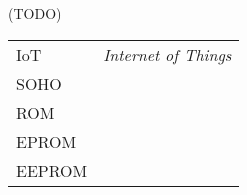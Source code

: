 (TODO)
\begin{longtable}{ll}
  IoT & \textit{Internet of Things} \\
  SOHO & \textit{} \\
  ROM & \textit{} \\
  EPROM & \textit{} \\
  EEPROM & \textit{} \\
\end{longtable}

